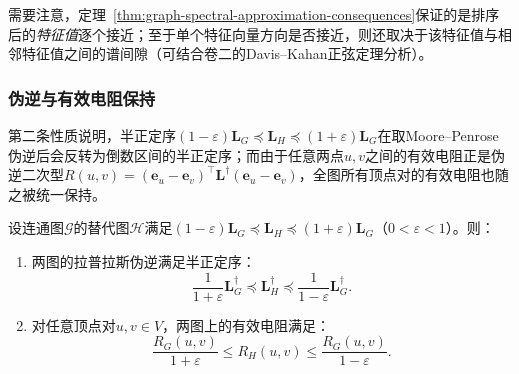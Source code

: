 需要注意，定理~\ref{thm:graph-spectral-approximation-consequences}保证的是排序后的\emph{特征值}逐个接近；至于单个特征向量方向是否接近，则还取决于该特征值与相邻特征值之间的谱间隙（可结合卷二的Davis--Kahan正弦定理分析）。

\subsubsection{伪逆与有效电阻保持}
\label{sec:graph-sparsification-resistance-preservation}

第二条性质说明，半正定序$(1-\varepsilon)\bm L_G\preceq\bm L_H\preceq(1+\varepsilon)\bm L_G$在取Moore--Penrose伪逆后会反转为倒数区间的半正定序；而由于任意两点$u,v$之间的有效电阻正是伪逆二次型$R(u,v)=(\bm e_u-\bm e_v)^\top\bm L^\dagger(\bm e_u-\bm e_v)$，全图所有顶点对的有效电阻也随之被统一保持。

\begin{theorem}[谱近似保持伪逆与有效电阻]
\label{thm:graph-sparsification-resistance}
设连通图$\mathcal G$的替代图$\mathcal H$满足$(1-\varepsilon)\bm L_G\preceq\bm L_H\preceq(1+\varepsilon)\bm L_G$（$0<\varepsilon<1$）。则：
\begin{enumerate}
\item 两图的拉普拉斯伪逆满足半正定序：
\begin{equation}
\frac{1}{1+\varepsilon}\bm L_G^\dagger
\preceq \bm L_H^\dagger
\preceq \frac{1}{1-\varepsilon}\bm L_G^\dagger.
\label{eq:graph-sparsification-inverse-order}
\end{equation}
\item 对任意顶点对$u,v\in V$，两图上的有效电阻满足：
\begin{equation}
\frac{R_G(u,v)}{1+\varepsilon}
\leq R_H(u,v)
\leq \frac{R_G(u,v)}{1-\varepsilon}.
\label{eq:graph-sparsification-resistance}
\end{equation}
\end{enumerate}
\end{theorem}

